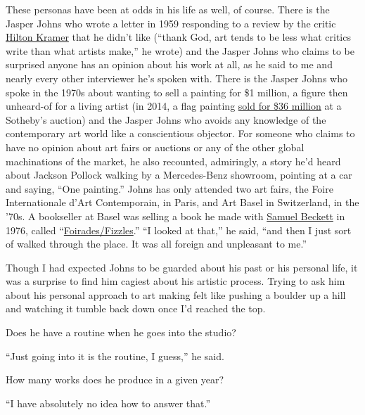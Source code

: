 These personas have been at odds in his life as well, of course. There
is the Jasper Johns who wrote a letter in 1959 responding to a review by
the critic
\href{https://www.nytimes.com/2012/03/28/arts/design/hilton-kramer-critic-who-championed-modernism-dies-at-84.html}{Hilton
Kramer} that he didn't like (``thank God, art tends to be less what
critics write than what artists make,'' he wrote) and the Jasper Johns
who claims to be surprised anyone has an opinion about his work at all,
as he said to me and nearly every other interviewer he's spoken with.
There is the Jasper Johns who spoke in the 1970s about wanting to sell a
painting for \$1 million, a figure then unheard-of for a living artist
(in 2014, a flag painting
\href{https://www.nytimes.com/2014/11/12/arts/design/rothko-and-johns-paintings-are-stars-of-a-sluggish-auction-for-sothebys.html}{sold
for \$36 million} at a Sotheby's auction) and the Jasper Johns who
avoids any knowledge of the contemporary art world like a conscientious
objector. For someone who claims to have no opinion about art fairs or
auctions or any of the other global machinations of the market, he also
recounted, admiringly, a story he'd heard about Jackson Pollock walking
by a Mercedes-Benz showroom, pointing at a car and saying, ``One
painting.'' Johns has only attended two art fairs, the Foire
Internationale d'Art Contemporain, in Paris, and Art Basel in
Switzerland, in the '70s. A bookseller at Basel was selling a book he
made with
\href{https://www.nytimes.com/topic/person/samuel-beckett}{Samuel
Beckett} in 1976, called
``\href{https://www.manhattanrarebooks.com/pages/books/195/jasper-johns-samuel-beckett/foirades-fizzles/?soldItem=true}{Foirades/Fizzles}.''
``I looked at that,'' he said, ``and then I just sort of walked through
the place. It was all foreign and unpleasant to me.''

Though I had expected Johns to be guarded about his past or his personal
life, it was a surprise to find him cagiest about his artistic process.
Trying to ask him about his personal approach to art making felt like
pushing a boulder up a hill and watching it tumble back down once I'd
reached the top.

Does he have a routine when he goes into the studio?

``Just going into it is the routine, I guess,'' he said.

How many works does he produce in a given year?

``I have absolutely no idea how to answer that.''


